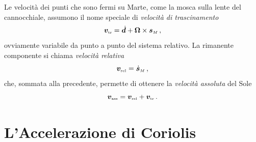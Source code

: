 \noindent Le velocit\`a dei punti che sono fermi su Marte, come la mosca sulla lente del
cannocchiale, assumono il nome speciale di {\em velocit\`a di trascinamento}
\begin{equation}
{\bm v}_{\scriptscriptstyle{{\rm tr}}}=
	\dot{\bm{d}}+
 {\bm \Omega}\times 
	\bm{s}_{\scriptscriptstyle{M}}\,,
\label{e131}
\end{equation}
ovviamente variabile da punto a punto del sistema relativo.
\noindent La rimanente componente si chiama {\em velocit\`a relativa}
\begin{equation}
{\bm v}_{\scriptscriptstyle{{\rm rel}}}=
\dot{\bm{s}}_{\scriptscriptstyle{M}}\,,
\label{e132}
\end{equation}
\noindent che, sommata alla precedente, permette di ottenere
la {\em velocit\`a assoluta}
del Sole 
\begin{equation}
{\bm v}_{\scriptscriptstyle{{\rm ass}}}=
{\bm v}_{\scriptscriptstyle{{\rm rel}}}+
{\bm v}_{\scriptscriptstyle{{\rm tr}}}\,.
\label{e133}
\end{equation}
\section{L'Accelerazione di Coriolis}

